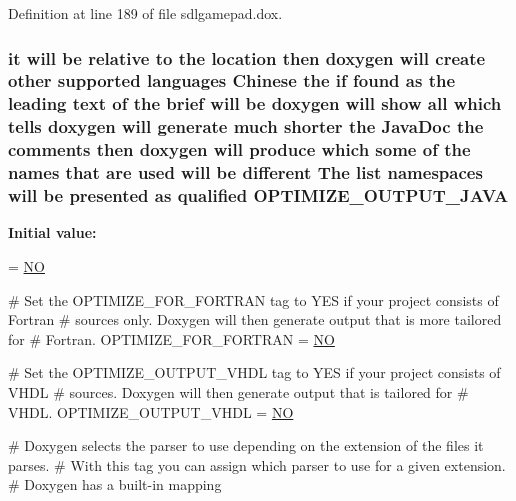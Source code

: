 Definition at line 189 of file sdlgamepad.\-dox.

\hypertarget{sdlgamepad_8dox_afd2bb55c95bb3cedff4f1baa0d0f09e1}{
\subsubsection[{O\-P\-T\-I\-M\-I\-Z\-E\-\_\-\-O\-U\-T\-P\-U\-T\-\_\-\-J\-A\-V\-A}]{\setlength{\rightskip}{0pt plus 5cm}it will be relative to the {\bf location} then doxygen will create other supported languages {\bf Chinese} the {\bf if} found as the leading text of the brief will be doxygen will show all which tells doxygen will generate much shorter the Java\-Doc the comments then doxygen will produce which some of the names that {\bf are} used will be different The list namespaces will be presented as qualified O\-P\-T\-I\-M\-I\-Z\-E\-\_\-\-O\-U\-T\-P\-U\-T\-\_\-\-J\-A\-V\-A}}\label{sdlgamepad_8dox_afd2bb55c95bb3cedff4f1baa0d0f09e1}
{\bfseries Initial value\-:}
\begin{DoxyCode}
= \hyperlink{sdlgamepad_8dox_a0f6a46245280dc38baf9600906aa1393}{NO}

\textcolor{preprocessor}{# Set the OPTIMIZE\_FOR\_FORTRAN tag to YES if your project consists of Fortran}
\textcolor{preprocessor}{}\textcolor{preprocessor}{# sources only. Doxygen will then generate output that is more tailored for}
\textcolor{preprocessor}{}\textcolor{preprocessor}{# Fortran.}
\textcolor{preprocessor}{}
OPTIMIZE\_FOR\_FORTRAN   = \hyperlink{sdlgamepad_8dox_a0f6a46245280dc38baf9600906aa1393}{NO}

\textcolor{preprocessor}{# Set the OPTIMIZE\_OUTPUT\_VHDL tag to YES if your project consists of VHDL}
\textcolor{preprocessor}{}\textcolor{preprocessor}{# sources. Doxygen will then generate output that is tailored for}
\textcolor{preprocessor}{}\textcolor{preprocessor}{# VHDL.}
\textcolor{preprocessor}{}
OPTIMIZE\_OUTPUT\_VHDL   = \hyperlink{sdlgamepad_8dox_a0f6a46245280dc38baf9600906aa1393}{NO}

\textcolor{preprocessor}{# Doxygen selects the parser to use depending on the extension of the files it parses.}
\textcolor{preprocessor}{}\textcolor{preprocessor}{# With this tag you can assign which parser to use for a given extension.}
\textcolor{preprocessor}{# Doxygen has a built-in mapping}
\end{DoxyCode}


